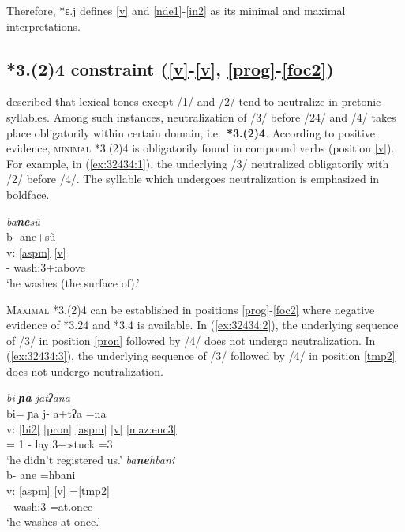 \documentclass[output=paper]{langscibook}
\begin{document}
Therefore, *ɛ.j defines \ref{v} and \ref{nde1}-\ref{in2} as its minimal and maximal interpretations.

\subsection{*3.(2)4 constraint (\ref{v}-\ref{v}, \ref{prog}-\ref{foc2})}\label{sec:d:32434}
\citet[154--161]{nakamoto20} described that lexical tones except /1/ and /2/ tend to neutralize in pretonic syllables. Among such instances, neutralization of /3/ before /24/ and /4/ takes place obligatorily within certain domain, i.e.~\textbf{*3.(2)4}. According to positive evidence, \textsc{minimal *3.(2)4} is obligatorily found in compound verbs (position \ref{v}). For example, in (\ref{ex:32434:1}), the underlying /3/ neutralized obligatorily with /2/ before /4/. The syllable which undergoes neutralization is emphasized in boldface.

\ea \label{ex:32434:1} \textit{ba\2\textbf{ne\2}\st{}sũ\4}\\
\glll {} b- a\2ne\3\ff{}+sũ\4\\
v: \ref{aspm} \ref{v}\\
{} \Hab- wash:3+\Pos:above\\
\glt `he washes (the surface of).'
\z

\textsc{Maximal *3.(2)4} can be established in positions \ref{prog}-\ref{foc2} where negative evidence of *3.24 and *3.4 is available. In (\ref{ex:32434:2}), the underlying sequence of /3/ in position \ref{pron} followed by /4/ does not undergo neutralization. In (\ref{ex:32434:3}), the underlying sequence of /3/ followed by /4/ in position \ref{tmp2} does not undergo neutralization.

\ea \label{ex:32434:2} \textit{bi\4 \textbf{\st{}ɲa\3} ja\4\st{}tʔa\2na\3}\\
\glll {} bi\4= ɲa\3\ff{} j- a\4+tʔa\2 =na\3\ff\\
v: \ref{bi2} \ref{pron} \ref{aspm} \ref{v} \ref{maz:enc3}\\
{} \Neg= \Pronom{}1\Incl{} \Pfv- lay:3+\Pos:stuck =3\Incl\\
\glt `he didn't registered us.'
\ex \label{ex:32434:3} \textit{ba\2\textbf{\st{}ne\3}hba\4ni\2\3}\\
\glll {} b- a\2ne\3\ff{} =hba\4ni\2\3\\
v: \ref{aspm} \ref{v} =\ref{tmp2}\\
{} \Hab- wash:3 =at.once\\
\glt `he washes at once.'
\z
\end{document}
